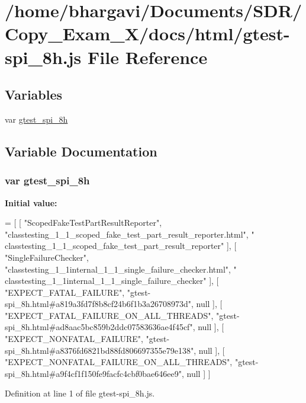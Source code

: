 \hypertarget{gtest-spi__8h_8js}{}\section{/home/bhargavi/\+Documents/\+S\+D\+R/\+Copy\+\_\+\+Exam\+\_\+X/docs/html/gtest-\/spi\+\_\+8h.js File Reference}
\label{gtest-spi__8h_8js}
\subsection*{Variables}
\begin{DoxyCompactItemize}
\item 
var \hyperlink{gtest-spi__8h_8js_ad5651420aab3e7fa5ffda3ceb38b0c5a}{gtest\+\_\+spi\+\_\+8h}
\end{DoxyCompactItemize}


\subsection{Variable Documentation}
\subsubsection[{\texorpdfstring{gtest\+\_\+spi\+\_\+8h}{gtest_spi_8h}}]{\setlength{\rightskip}{0pt plus 5cm}var gtest\+\_\+spi\+\_\+8h}\hypertarget{gtest-spi__8h_8js_ad5651420aab3e7fa5ffda3ceb38b0c5a}{}\label{gtest-spi__8h_8js_ad5651420aab3e7fa5ffda3ceb38b0c5a}
{\bfseries Initial value\+:}
\begin{DoxyCode}
=
[
    [ \textcolor{stringliteral}{"ScopedFakeTestPartResultReporter"}, \textcolor{stringliteral}{"classtesting\_1\_1\_scoped\_fake\_test\_part\_result\_reporter.html"}, \textcolor{stringliteral}{"
      classtesting\_1\_1\_scoped\_fake\_test\_part\_result\_reporter"} ],
    [ \textcolor{stringliteral}{"SingleFailureChecker"}, \textcolor{stringliteral}{"classtesting\_1\_1internal\_1\_1\_single\_failure\_checker.html"}, \textcolor{stringliteral}{"
      classtesting\_1\_1internal\_1\_1\_single\_failure\_checker"} ],
    [ \textcolor{stringliteral}{"EXPECT\_FATAL\_FAILURE"}, \textcolor{stringliteral}{"gtest-spi\_8h.html#a819a3fd7f8b8cf24b6f1b3a26708973d"}, null ],
    [ \textcolor{stringliteral}{"EXPECT\_FATAL\_FAILURE\_ON\_ALL\_THREADS"}, \textcolor{stringliteral}{"gtest-spi\_8h.html#ad8aac5bc859b2ddc07583636ae4f45cf"}, null ],
    [ \textcolor{stringliteral}{"EXPECT\_NONFATAL\_FAILURE"}, \textcolor{stringliteral}{"gtest-spi\_8h.html#a8376fd6821bd88fd806697355e79e138"}, null ],
    [ \textcolor{stringliteral}{"EXPECT\_NONFATAL\_FAILURE\_ON\_ALL\_THREADS"}, \textcolor{stringliteral}{"gtest-spi\_8h.html#a9f4cf1f150fe9facfc4cbf0bae646ee9"}, null
       ]
]
\end{DoxyCode}


Definition at line 1 of file gtest-\/spi\+\_\+8h.\+js.

